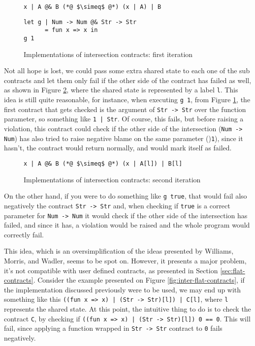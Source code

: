 \documentclass[sigplan,10pt,review,anonymous]{acmart}
\newcommand{\nickel}[1]{\lstinline[language=nickel]{#1}}
\begin{document}
\begin{figure}[h]
\begin{lstlisting}[language=nickel, title=Implementation]
x | A @& B (*@ $\simeq$ @*) (x | A) | B
\end{lstlisting}
\begin{lstlisting}[language=nickel, title=Problem]
let g | Num -> Num @& Str -> Str
      = fun x => x in
g 1
\end{lstlisting}
\caption{Implementations of intersection contracts: first iteration}
\label{fig:inter-contracts}
\end{figure}

Not all hope is lost, we could pass some extra shared state
to each one of the sub contracts and let them only fail if the other
side of the contract has failed as well, as shown in Figure
\ref{fig:inter-contracts-2}, where the shared state is
represented by a label \nickel{l}.
This idea is still quite reasonable, for instance, when executing
\nickel{g 1}, from Figure \ref{fig:inter-contracts}, the first contract
that gets checked is the argument of \nickel{Str -> Str} over the function parameter, so
something like \nickel{1 | Str}.
Of course, this fails, but before raising a violation, this contract could
check if the other side of the intersection (\nickel{Num -> Num}) has
also tried to raise negative blame on the same parameter ()\nickel{1}), since
it hasn't, the contract would return normally, and would mark itself as failed.

\begin{figure}[h]
\begin{lstlisting}[language=nickel, title=Implementation]
x | A @& B (*@ $\simeq$ @*) (x | A[l]) | B[l]
\end{lstlisting}
\caption{Implementations of intersection contracts: second iteration}
\label{fig:inter-contracts-2}
\end{figure}

On the other hand, if you were to do something like
\nickel{g true}, that would fail also negatively the contract
\nickel{Str -> Str} and, when checking if \nickel{true}
is a correct parameter for \nickel{Num -> Num} it would check
if the other side of the intersection has failed, and since it
has, a violation would be raised and the whole program would
correctly fail.

This idea, which is an oversimplification of the ideas
presented by Williams, Morris, and Wadler, seems to be spot on.
However, it presents a major problem, it's not compatible with user defined contracts,
as presented in Section \ref{sec:flat-contracts}.
Consider the example presented on Figure \ref{fig:inter-flat-contracts}, if the
implementation discussed previously were to be used, we may end up with
something like this \nickel{((fun x => x) | (Str -> Str)[l]) | C[l]}, where
\nickel{l} represents the shared state.
At this point, the intuitive thing to do is to check the contract \nickel{C}, by
checking if \nickel{((fun x => x) | (Str -> Str)[l]) 0 == 0}.  This will fail,
since applying a function wrapped in \nickel{Str -> Str} contract to \nickel{0}
fails negatively.
\end{document}
